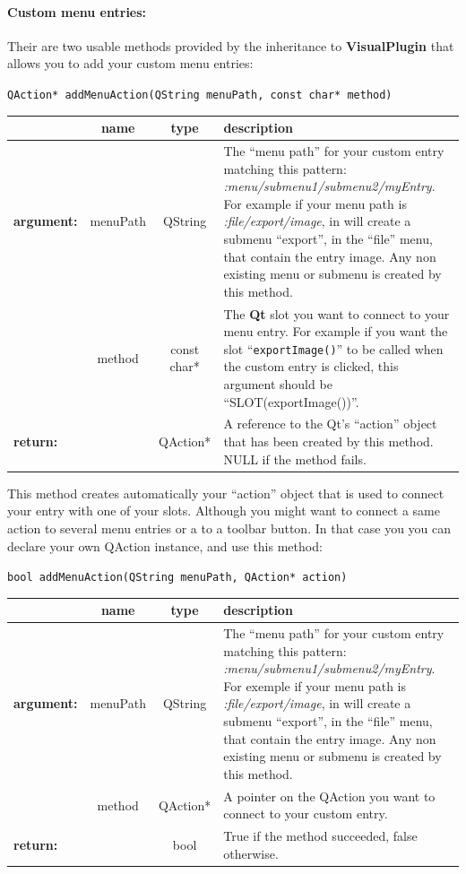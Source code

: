 \documentclass[a4paper]{scrreprt}
\begin{document}
	\paragraph{Custom menu entries:}
	Their are two usable methods provided by the inheritance to
	\textbf{VisualPlugin} that allows you to add your custom menu entries:
	\begin{center}
		\texttt{QAction* addMenuAction(QString menuPath, const char* method)}
	\begin{tabular}{|l|c|c|p{}|}
		\hline
		~ & name & type & description
		\\ \hline
		\textbf{argument:} & menuPath & QString &
			The ``menu path'' for your custom entry matching this pattern:
			\textit{:menu/submenu1/submenu2/myEntry}. For example if your menu path is
			\textit{:file/export/image}, in will create a submenu ``export'', in the
			``file'' menu, that contain the entry image. Any non existing menu or submenu
			is created by this method.
		\\
		\cline{2-4}
		~ & method & const char* &
			The \textbf{Qt} slot you want to connect to your menu entry. For example if
			you want the slot ``\texttt{exportImage()}'' to be called when the custom
			entry is clicked, this argument should be ``SLOT(exportImage())''.
		\\ \hline
		\textbf{return:} & ~ & QAction* &
			A reference to the Qt's ``action'' object that has been created by this
			method. NULL if the method fails.
		\\ \hline
	\end{tabular}
	\end{center}
	This method creates automatically your ``action'' object that is used to
	connect your entry with one of your slots. Although you might want to connect a
	same action to several menu entries or a to a toolbar button. In that case you
	you can declare your own QAction instance, and use this method:
	\begin{center}
		\texttt{bool addMenuAction(QString menuPath, QAction* action)}
	\begin{tabular}{|l|c|c|p{}|}
		\hline
		~ & name & type & description
		\\ \hline
		\textbf{argument:} & menuPath & QString &
			The ``menu path'' for your custom entry matching this pattern:
			\textit{:menu/submenu1/submenu2/myEntry}. For exemple if your menu path is
			\textit{:file/export/image}, in will create a submenu ``export'', in the
			``file'' menu, that contain the entry image. Any non existing menu or submenu
			is created by this method.
		\\
		\cline{2-4}
		~ & method & QAction* &
			A pointer on the QAction you want to connect to your custom entry.
		\\ \hline
		\textbf{return:} & ~ & bool &
			True if the method succeeded, false otherwise.
		\\ \hline
	\end{tabular}
	\end{center}
	
\end{document}
